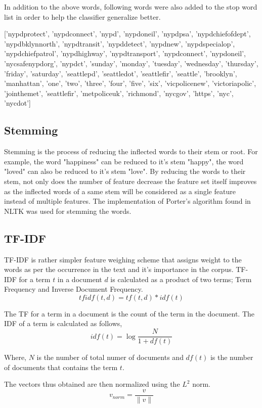 In addition to the above words, following words were also added to the stop word list in order to help the classifier generalize better.

['nypdprotect', 'nypdconnect', 'nypd', 'nypdoneil', 'nypdpsa', 'nypdchiefofdept', 'nypdbklynnorth', 'nypdtransit', 'nypddetect', 'nypdnew', 'nypdspecialop', 'nypdchiefpatrol', 'nypdhighway', 'nypdtransport', 'nypdconnect', 'nypdoneil', 'nycsafenypdorg', 'nypdct', 'sunday', 'monday', 'tuesday', 'wednesday', 'thursday', 'friday', 'saturday', 'seattlepd', 'seattledot', 'seattlefir', 'seattle', 'brooklyn', 'manhattan', 'one', 'two', 'three', 'four', 'five', 'six', 'vicpolicenew', 'victoriapolic', 'jointhemet', 'seattlefir', 'metpoliceuk', 'richmond', 'nycgov', 'https', 'nyc', 'nycdot']

\subsection{Stemming}
Stemming is the process of reducing the inflected words to their stem or root. For example, the word "happiness" can be reduced to it's stem "happy", the word "loved" can also be reduced to it's stem "love". By reducing the words to their stem, not only does the number of feature decrease the feature set itself improves as the inflected words of a same stem will be considered as a single feature instead of multiple features. The implementation of Porter's algorithm\cite{porter1980algorithm} found in NLTK was used for stemming the words.

\subsection{TF-IDF}
TF-IDF\cite{sparck1972statistical} is rather simpler feature weighing scheme that assigns weight to the words as per the occurrence in the text and it's importance in the corpus. TF-IDF for a term $t$ in a document $d$ is calculated as a product of two terms; Term Frequency and Inverse Document Frequency. 
\begin{equation}
    tfidf(t, d) = tf(t, d) * idf(t)
\end{equation}

The TF for a term in a document is the count of the term in the document. The IDF of a term is calculated as follows,
\begin{equation}
    idf(t) = \log{\frac{N}{1 + df(t)}}
\end{equation}

Where, $N$ is the number of total numer of documents and $df(t)$ is the number of documents that contains the term $t$.\par
The vectors thus obtained are then normalized using the $L^2$ norm.
\begin{equation}
    v_{norm} = \frac{v}{\lVert v \rVert}
\end{equation}


